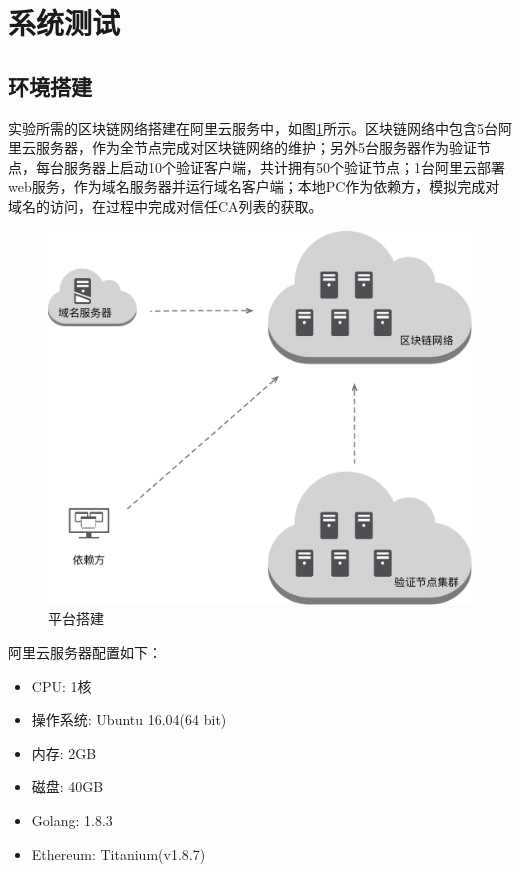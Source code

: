 
\section{系统测试}


\subsection{环境搭建}



实验所需的区块链网络搭建在阿里云服务中，如图\ref{fig:platform}所示。区块链网络中包含5台阿里云服务器，作为全节点完成对区块链网络的维护；另外5台服务器作为验证节点，每台服务器上启动10个验证客户端，共计拥有50个验证节点；1台阿里云部署web服务，作为域名服务器并运行域名客户端；本地PC作为依赖方，模拟完成对域名的访问，在过程中完成对信任CA列表的获取。

\begin{figure}[htbp]
 	\centering
 	\includegraphics[scale = 0.4]{img/platform}
 	\caption{平台搭建}\label{fig:platform}
\end{figure}

阿里云服务器配置如下：

\begin{itemize}
	\item CPU: 1核
	\item 操作系统: Ubuntu 16.04(64 bit)
	\item 内存: 2GB
	\item 磁盘: 40GB
	\item Golang: 1.8.3
	\item Ethereum: Titanium(v1.8.7)
\end{itemize}

